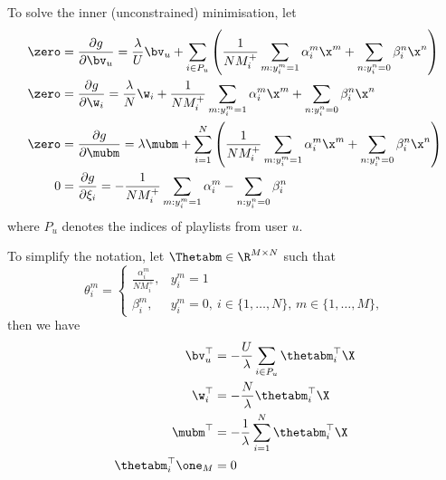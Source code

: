 To solve the inner (unconstrained) minimisation, let
\begin{equation*}
\begin{aligned}
\zero &= \frac{\partial g}{\partial \bv_u} 
       = \frac{\lambda}{U} \bv_u 
         + \sum_{i \in P_u} \left( \frac{1}{N M_i^+} \sum_{m: y_i^m = 1} \alpha_i^m \x^m + \sum_{n: y_i^n = 0} \beta_i^n \x^n \right) \\
\zero &= \frac{\partial g}{\partial \w_i}
       = \frac{\lambda}{N} \w_i + \frac{1}{N M_i^+} \sum_{m: y_i^m = 1} \alpha_i^m \x^m + \sum_{n: y_i^n = 0} \beta_i^n \x^n \\
\zero &= \frac{\partial g}{\partial \mubm} 
       = \lambda \mubm + \sum_{i=1}^N \left( \frac{1}{N M_i^+} \sum_{m: y_i^m = 1} \alpha_i^m \x^m + \sum_{n: y_i^n = 0} \beta_i^n \x^n \right) \\
0     &= \frac{\partial g}{\partial \xi_i}
       = - \frac{1}{N M_i^+} \sum_{m: y_i^m = 1} \alpha_i^m - \sum_{n: y_i^n = 0} \beta_i^n \\
\end{aligned}
\end{equation*}
where $P_u$ denotes the indices of playlists from user $u$.

To simplify the notation, let $\Thetabm \in \R^{M \times N}$ such that
\begin{equation*}
\theta_i^m = 
\begin{cases}
    \frac{\alpha_i^m}{N M_i^+}, & y_i^m = 1 \\
    \beta_i^m, & y_i^m = 0, \ i \in \{1,\dots,N\}, \, m \in \{1,\dots,M\},
\end{cases}
\end{equation*}
then we have
\begin{equation*}
\begin{aligned}
\bv_u^\top &= -\frac{U}{\lambda} \sum_{i \in P_u} \thetabm_i^\top \X \\
\w_i^\top  &= -\frac{N}{\lambda} \thetabm_i^\top \X \\
\mubm^\top &= -\frac{1}{\lambda} \sum_{i=1}^N \thetabm_i^\top \X \\
\thetabm_i^\top \one_M &= 0
\end{aligned}
\end{equation*}

